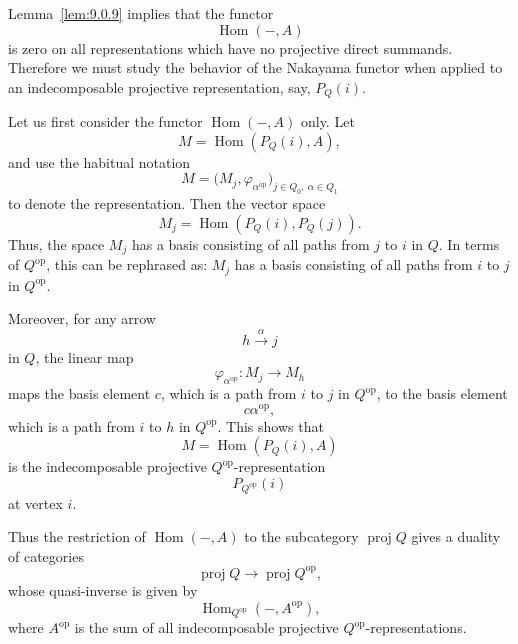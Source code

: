 \documentclass[11pt, a4paper]{report}
\begin{document}
                Lemma~\ref{lem:9.0.9} implies that the functor
                \[
                \operatorname{Hom}(-,A)
                \]
                is zero on all representations which have no projective direct summands.
                Therefore we must study the behavior of the Nakayama functor when applied to an
                indecomposable projective representation, say, $P_Q(i)$.

                Let us first consider the functor $\operatorname{Hom}(-,A)$ only. Let
                \[
                M=\operatorname{Hom}(P_Q(i),A),
                \]
                and use the habitual notation
                \[
                M=\bigl(M_j,\varphi_{\alpha^{\operatorname{op}}}\bigr)_{j\in Q_0,\ \alpha\in Q_1}
                \]
                to denote the representation. Then the vector space
                \[
                M_j=\operatorname{Hom}(P_Q(i),P_Q(j)).
                \]
                Thus, the space $M_j$ has a basis consisting of all
                paths from $j$ to $i$ in $Q$. In terms of $Q^{\operatorname{op}}$, this can be
                rephrased as: $M_j$ has a basis consisting of all paths from $i$ to $j$ in
                $Q^{\operatorname{op}}$.

                Moreover, for any arrow
                \[
                h \xrightarrow{\alpha} j
                \]
                in $Q$, the linear map
                \[
                \varphi_{\alpha^{\operatorname{op}}} : M_j \to M_h
                \]
                maps the basis element $c$, which is a path from $i$ to $j$ in
                $Q^{\operatorname{op}}$, to the basis element
                \[
                c\alpha^{\operatorname{op}},
                \]
                which is a path from $i$ to $h$ in $Q^{\operatorname{op}}$. This shows that
                \[
                M=\operatorname{Hom}(P_Q(i),A)
                \]
                is the indecomposable projective $Q^{\operatorname{op}}$-representation
                \[
                P_{Q^{\operatorname{op}}}(i)
                \]
                at vertex $i$.

                Thus the restriction of $\operatorname{Hom}(-,A)$ to the subcategory
                $\operatorname{proj} Q$ gives a duality of categories
                \[
                \operatorname{proj} Q \longrightarrow \operatorname{proj} Q^{\operatorname{op}},
                \]
                whose quasi-inverse is given by
                \[
                \operatorname{Hom}_{Q^{\operatorname{op}}}(-,A^{\operatorname{op}}),
                \]
                where $A^{\operatorname{op}}$ is the sum of all indecomposable projective
                $Q^{\operatorname{op}}$-representations.
\end{document}
